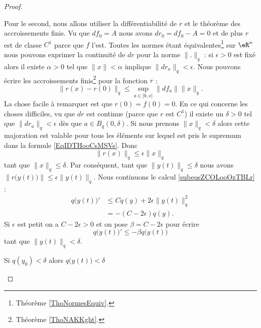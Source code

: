 \begin{proof}
\begin{subproof}
    Pour le second, nous allons utiliser la différentiabilité de \( r\) et le théorème des accroissements finis. Vu que \( df_0=A\) nous avons \( dr_0=df_0-A=0\) et de plus \( r\) est de classe \( C^1\) parce que \( f\) l'est. Toutes les normes étant équivalentes\footnote{Théorème \ref{ThoNormesEquiv}.} sur \( \eR^n\) nous pouvons exprimer la continuité de \( dr\) pour la norme \( \| . \|_q\) : si \( \epsilon>0\) est fixé alors il existe \( \alpha>0\) tel que \( \| x \|<\alpha\) implique \( \| dr_x \|_q<\epsilon\). Nous pouvons écrire les accroissements finis\footnote{Théorème \ref{ThoNAKKght}.} pour la fonction \( r\) :
    \begin{equation}    \label{EqIDTHooCsMSVs}
        \| r(x)-r(0) \|_q\leq \sup_{a\in\mathopen[ 0 , x \mathclose]}\| df_a \|\| x \|_q.
    \end{equation}
    La chose facile à remarquer est que \( r(0)=f(0)=0\). En ce qui concerne les choses difficiles, vu que \( dr\) est continue (parce que \( r\) est \( C^1\)) il existe un \( \delta>0\) tel que \( \| dr_a \|_q<\epsilon\) dès que \( a\in B_q(0,\delta)\). Si nous prenons \( \| x \|_q<\delta\) alors cette majoration est valable pour tous les éléments sur lequel est pris le supremum dans la formule \eqref{EqIDTHooCsMSVs}. Donc
    \begin{equation}
        \| r(x) \|_q\leq \epsilon\| x \|_q
    \end{equation}
    tant que \( \| x \|_q\leq \delta\). Par conséquent, tant que \(  \| y(t) \|_q\leq \delta\) nous avons \( \| r\big( y(t) \big) \|\leq \epsilon\| y(t) \|_q\). Nous continuons le calcul \eqref{subeqsZCOLooOzTBLr} :
    \begin{subequations}
        \begin{align}
            q\big( y(t) \big)'&\leq Cq(y)+2\epsilon\| y(t) \|_q^2\\
            &=-(C-2\epsilon)q(y).
        \end{align}
    \end{subequations}
    Si \( \epsilon\) est petit on a \( C-2\epsilon >0 \) et on pose \( \beta=C-2\epsilon\) pour écrire
    \begin{equation}    \label{EqEYJIooHvSBic}
        q\big( y(t) \big)'\leq -\beta q\big( y(t) \big)
    \end{equation}
    tant que \( \| y(t) \|_q<\delta\).
    
\item[Si \( q(y_0)<\delta  \) alors \( q\big( y(t) \big) < \delta \)]


\end{subproof}
\end{proof}
